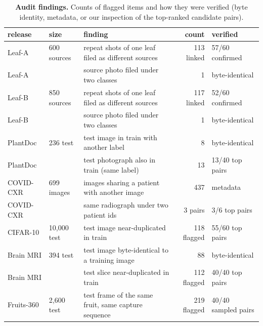 \begin{table}[t]
\centering\small
\setlength{\tabcolsep}{4pt}
\caption{\textbf{Audit findings.} Counts of flagged items and how they were verified (byte identity, metadata, or our inspection of the top-ranked candidate pairs).}
\label{tab:audit}
\begin{tabular}{@{}llp{5.2cm}rl@{}}
\toprule
release & size & finding & count & verified \\
\midrule
Leaf-A & 600 sources & repeat shots of one leaf filed as different sources & 113 linked & 57/60 confirmed \\
Leaf-A &  & source photo filed under two classes & 1 & byte-identical \\
Leaf-B & 850 sources & repeat shots of one leaf filed as different sources & 117 linked & 52/60 confirmed \\
Leaf-B &  & source photo filed under two classes & 1 & byte-identical \\
PlantDoc & 236 test & test image in train with another label & 8 & byte-identical \\
PlantDoc &  & test photograph also in train (same label) & 13 & 13/40 top pairs \\
COVID-CXR & 699 images & images sharing a patient with another image & 437 & metadata \\
COVID-CXR &  & same radiograph under two patient ids & 3 pairs & 3/6 top pairs \\
CIFAR-10 & 10,000 test & test image near-duplicated in train & 118 flagged & 55/60 top pairs \\
Brain MRI & 394 test & test image byte-identical to a training image & 88 & byte-identical \\
Brain MRI &  & test slice near-duplicated in train & 112 flagged & 40/40 top pairs \\
Fruits-360 & 2,600 test & test frame of the same fruit, same capture sequence & 219 flagged & 40/40 sampled pairs \\
\bottomrule
\end{tabular}
\end{table}
